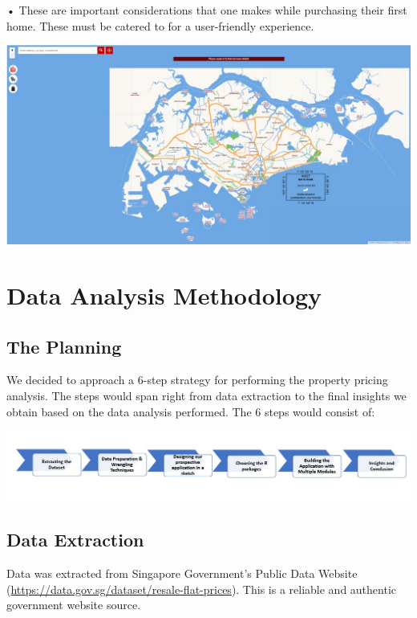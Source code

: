 \documentclass{acm_proc_article-sp}
\begin{document}
• These are important considerations that one makes while purchasing
their first home. These must be catered to for a user-friendly
experience.

\includegraphics{IMG/img3.jpg}

\hypertarget{data-analysis-methodology}{%
\section{Data Analysis Methodology}\label{data-analysis-methodology}}

\hypertarget{the-planning}{%
\subsection{The Planning}\label{the-planning}}

We decided to approach a 6-step strategy for performing the property
pricing analysis. The steps would span right from data extraction to the
final insights we obtain based on the data analysis performed. The 6
steps would consist of:

\includegraphics{IMG/img4.jpg}

\hypertarget{data-extraction}{%
\subsection{Data Extraction}\label{data-extraction}}

Data was extracted from Singapore Government's Public Data Website
(\url{https://data.gov.sg/dataset/resale-flat-prices}). This is a
reliable and authentic government website source.
\end{document}

